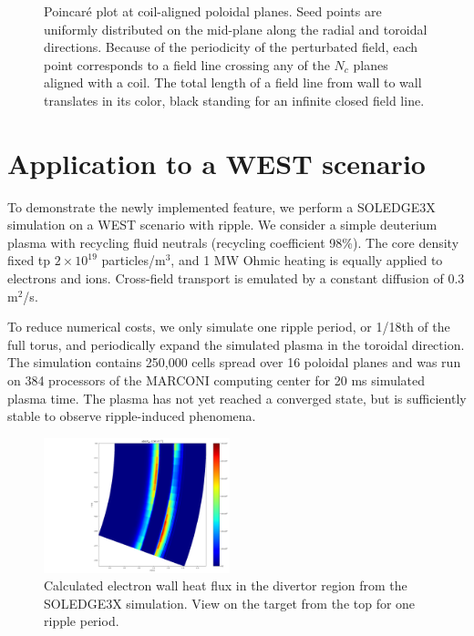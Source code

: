 \begin{figure}[H]
\begin{subfigure}[t]{0.49\textwidth}
		\label{fig:poincareXpt}
	\end{subfigure}
	\caption[Poincaré plot at coil-aligned poloidal planes. Seed points are uniformly distributed on the mid-plane along the radial and toroidal directions]{Poincaré plot at coil-aligned poloidal planes. Seed points are uniformly distributed on the mid-plane along the radial and toroidal directions. Because of the periodicity of the perturbated field, each point corresponds to a field line crossing any of the $N_c$ planes aligned with a coil. The total length of a field line from wall to wall translates in its color, black standing for an infinite closed field line.}
	\label{fig:poincare}
\end{figure}




\section{Application to a WEST scenario}
\label{sec:ripple_applicationWEST}
To demonstrate the newly implemented feature, we perform a SOLEDGE3X simulation on a WEST scenario with ripple. We consider a simple deuterium plasma with recycling fluid neutrals (recycling coefficient 98\%). The core density fixed tp $2\times 10^{19}$ particles/m$^3$, and 1 MW Ohmic heating is equally applied to electrons and ions. Cross-field transport is emulated by a constant diffusion of $0.3$ m$^2$/s. \newline

To reduce numerical costs, we only simulate one ripple period, or 1/18th of the full torus, and periodically expand the simulated plasma in the toroidal direction. The simulation contains 250,000 cells spread over 16 poloidal planes and was run on 384 processors of the MARCONI computing center\cite{iannone2018marconi-fusion} for 20 ms simulated plasma time. The plasma has not yet reached a converged state, but is sufficiently stable to observe ripple-induced phenomena.

\begin{figure}[H]
	\centering
	\includegraphics[width=0.48\textwidth]{schemes/WESTripple_targetHeatFlux.png}
	\caption[Calculated electron wall heat flux in the divertor region from the SOLEDGE3X simulation]{Calculated electron wall heat flux in the divertor region from the SOLEDGE3X simulation. View on the target from the top for one ripple period.}
	\label{fig:target_S3X}
\end{figure}

